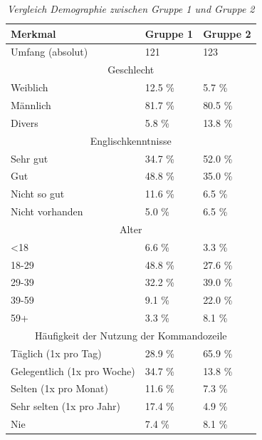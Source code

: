 \begin{table}[htbp]
\centering
\caption{\textit{Vergleich Demographie zwischen Gruppe 1 und Gruppe 2}}
\begin{tabular}{  p{6cm} p{3cm} p{3cm}  }
  \hline
  Merkmal & Gruppe 1 & Gruppe 2 \\
  \hline
  Umfang (absolut) & 121  & 123 \\
  \hline
  \multicolumn{3}{c}{Geschlecht} \\
  \hline
  Weiblich                      & 12.5 \%       & 5.7  \%       \\
  Männlich                      & 81.7 \%       & 80.5 \%       \\
  Divers                        & 5.8  \%       & 13.8 \%       \\
  \hline
  \multicolumn{3}{c}{Englischkenntnisse} \\
  \hline
  Sehr gut                      & 34.7 \%       & 52.0 \%      \\
  Gut                           & 48.8 \%       & 35.0 \%       \\
  Nicht so gut                  & 11.6 \%       & 6.5 \%        \\
  Nicht vorhanden               & 5.0  \%       & 6.5 \%        \\
  \hline
  \multicolumn{3}{c}{Alter} \\
  \hline
  <18                           & 6.6  \%       & 3.3  \%       \\
  18-29                         & 48.8 \%       & 27.6 \%       \\
  29-39                         & 32.2 \%       & 39.0 \%       \\
  39-59                         & 9.1  \%       & 22.0 \%       \\
  59+                           & 3.3  \%       & 8.1 \%        \\
  \hline
  \multicolumn{3}{c}{Häufigkeit der Nutzung der Kommandozeile} \\
  \hline
  Täglich (1x pro Tag)          & 28.9 \%       & 65.9  \%      \\
  Gelegentlich (1x pro Woche)   & 34.7 \%       & 13.8  \%      \\
  Selten (1x pro Monat)         & 11.6 \%       & 7.3  \%       \\
  Sehr selten (1x pro Jahr)     & 17.4 \%       & 4.9  \%       \\
  Nie                           & 7.4  \%       & 8.1  \%       \\
  \hline
\end{tabular}
\label{demo_g12}
\end{table}

